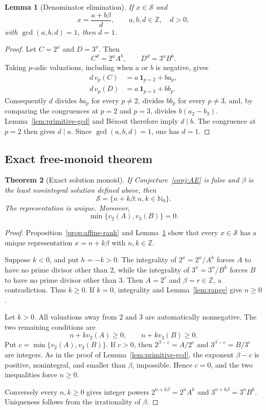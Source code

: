 \documentclass[11pt]{article}
\newtheorem{theorem}{Theorem}[section]
\newtheorem{lemma}[theorem]{Lemma}
\theoremstyle{definition}
\newcommand{\Nzero}{\mathbb N_0}
\newcommand{\Z}{\mathbb Z}
\begin{document}
\begin{lemma}[Denominator elimination]\label{lem:denominator-elimination}
If $x\in\mathcal S$ and
\[
  x=\frac{a+b\beta}{d},\qquad a,b,d\in\Z,\quad d>0,
\]
with $\gcd(a,b,d)=1$, then $d=1$.
\end{lemma}
\begin{proof}
Let $C=2^x$ and $D=3^x$.  Then
\[
  C^d=2^aA^b,\qquad D^d=3^aB^b.
\]
Taking $p$-adic valuations, including when $a$ or $b$ is negative, gives
\begin{align*}
  d\,v_p(C)&=a\,\mathbf 1_{p=2}+b a_p,\\
  d\,v_p(D)&=a\,\mathbf 1_{p=3}+b b_p.
\end{align*}
Consequently $d$ divides $b a_p$ for every $p\ne2$, divides $b b_p$ for every
$p\ne3$, and, by comparing the congruences at $p=2$ and $p=3$, divides
$b(a_2-b_3)$.  Lemma~\ref{lem:primitive-gcd} and B\'ezout therefore imply
$d\mid b$.  The congruence at $p=2$ then gives $d\mid a$.  Since
$\gcd(a,b,d)=1$, one has $d=1$.
\end{proof}

\subsection{Exact free-monoid theorem}

\begin{theorem}[Exact solution monoid]\label{thm:exact-monoid}
If Conjecture~\ref{conj:AE} is false and $\beta$ is the least nonintegral
solution defined above, then
\[
  \boxed{\mathcal S=\{n+k\beta:n,k\in\Nzero\}.}
\]
The representation is unique.  Moreover,
\[
  \min\{v_2(A),v_3(B)\}=0.
\]
\end{theorem}
\begin{proof}
Proposition~\ref{prop:affine-rank} and
Lemma~\ref{lem:denominator-elimination} show that every $x\in\mathcal S$ has a
unique representation $x=n+k\beta$ with $n,k\in\Z$.

Suppose $k<0$, and put $h=-k>0$.  The integrality of
$2^x=2^n/A^h$ forces $A$ to have no prime divisor other than $2$, while the
integrality of $3^x=3^n/B^h$ forces $B$ to have no prime divisor other than
$3$.  Then $A=2^r$ and $\beta=r\in\Z$, a contradiction.  Thus $k\ge0$.
If $k=0$, integrality and Lemma~\ref{lem:range} give $n\ge0$.

Let $k>0$.  All valuations away from $2$ and $3$ are automatically
nonnegative.  The two remaining conditions are
\[
  n+k v_2(A)\ge0,\qquad n+k v_3(B)\ge0.
\]
Put $c=\min\{v_2(A),v_3(B)\}$.  If $c>0$, then
$2^{\beta-c}=A/2^c$ and $3^{\beta-c}=B/3^c$ are integers.  As in the proof of
Lemma~\ref{lem:primitive-gcd}, the exponent $\beta-c$ is positive,
nonintegral, and smaller than $\beta$, impossible.  Hence $c=0$, and the two
inequalities force $n\ge0$.

Conversely every $n,k\ge0$ gives integer powers
$2^{n+k\beta}=2^nA^k$ and $3^{n+k\beta}=3^nB^k$.  Uniqueness follows from the
irrationality of $\beta$.
\end{proof}
\end{document}
